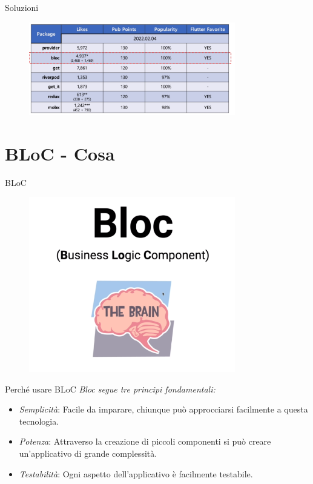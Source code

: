 \documentclass{../libs/presentation_format}
\begin{document}

\begin{frame}{Soluzioni}
	\begin{figure}[htpb]
		\centering
		\includegraphics[width=9cm]{../libs/state-management-stats}
	\end{figure}
\end{frame}


\section{BLoC - Cosa}
\begin{frame}{BLoC}
	\begin{figure}[htpb]
		\centering
		\includegraphics[width=9cm]{../libs/bloc-first-logo}
	\end{figure}
\end{frame}


\begin{frame}{Perché usare BLoC}
	\emph{Bloc segue tre principi fondamentali:}
	\begin{itemize}
		\item \emph{Semplicità}: Facile da imparare, chiunque può approcciarsi facilmente a questa tecnologia.
		\item \emph{Potenza}: Attraverso la creazione di piccoli componenti si può creare un'applicativo di grande complessità.
		\item \emph{Testabilità}: Ogni aspetto dell'applicativo è facilmente testabile.
	\end{itemize}
\end{frame}
\end{document}
